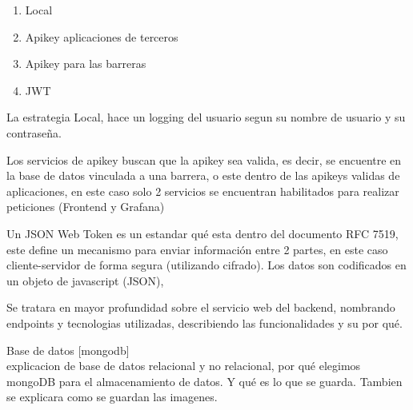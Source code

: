 \begin{enumerate}
        \item Local
        \item Apikey aplicaciones de terceros
        \item Apikey para las barreras
        \item JWT
\end{enumerate}

La estrategia Local, hace un logging del usuario segun su nombre de usuario y su contraseña.

Los servicios de apikey buscan que la apikey sea valida, es decir, se encuentre en la base de datos vinculada a una barrera, o este dentro de las apikeys validas de aplicaciones, en este caso solo 2 servicios se encuentran habilitados para realizar peticiones (Frontend y Grafana)

Un JSON Web Token es un estandar qué esta dentro del documento RFC 7519, este define un mecanismo para enviar información entre 2 partes, en este caso cliente-servidor de forma segura (utilizando cifrado). Los datos son codificados en un objeto de javascript (JSON), 

Se tratara en mayor profundidad sobre el servicio web del backend, nombrando endpoints y tecnologias utilizadas, describiendo las funcionalidades y su por qué.


Base de datos [mongodb] \\

explicacion de base de datos relacional y no relacional, por qué elegimos mongoDB para el almacenamiento de datos. Y qué es lo que se guarda. Tambien se explicara como se guardan las imagenes. \\
